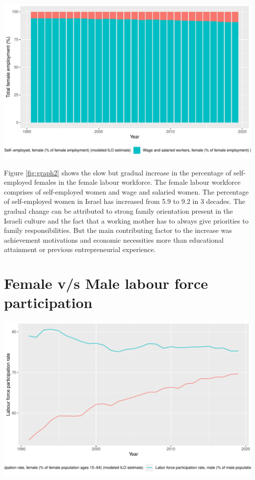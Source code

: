 \documentclass[11pt,a4paper,]{article}
\let\origfigure\figure
\let\endorigfigure\endfigure
\renewenvironment{figure}[1][2] {
    \expandafter\origfigure\expandafter[H]
} {
    \endorigfigure
}%
\begin{document}
\begin{figure}
\centering
\includegraphics{report_files/figure-latex/graph2-1.pdf}
\caption{\label{fig:graph2}Self-employed v/s Wage \& salaried female workers}
\end{figure}

Figure \ref{fig:graph2} shows the slow but gradual increase in the percentage of self-employed females in the female labour workforce. The female labour workforce comprises of self-employed women and wage and salaried women. The percentage of self-employed women in Israel has increased from 5.9 to 9.2 in 3 decades. The gradual change can be attributed to strong family orientation present in the Israeli culture and the fact that a working mother has to always give priorities to family responsibilities. But the main contributing factor to the increase was achievement motivations and economic necessities more than educational attainment or previous entrepreneurial experience. \textcite{lerner1997israeli}

\hypertarget{female-vs-male-labour-force-participation}{%
\section{Female v/s Male labour force participation}\label{female-vs-male-labour-force-participation}}

\begin{figure}
\centering
\includegraphics{report_files/figure-latex/graph3-1.pdf}
\caption{\label{fig:graph3}Female v/s Male labour force participation}
\end{figure}
\end{document}
